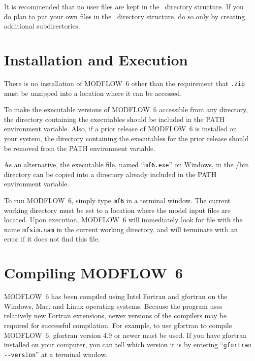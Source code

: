 \documentclass[11pt,twoside,twocolumn]{usgsreport}
\begin{document}


It is recommended that no user files are kept in the \modflowversion~directory structure.  If you do plan to put your own files in the \modflowversion~directory structure, do so only by creating additional subdirectories.

\section{Installation and Execution}
There is no installation of MODFLOW~6 other than the requirement that \texttt{\modflowversion.zip} must be unzipped into a location where it can be accessed.  

To make the executable versions of MODFLOW~6 accessible from any directory, the directory containing the executables should be included in the PATH environment variable.  Also, if a prior release of MODFLOW~6 is installed on your system, the directory containing the executables for the prior release should be removed from the PATH environment variable.

As an alternative, the executable file, named ``\texttt{mf6.exe}'' on Windows, in the \modflowversion{}/bin directory can be copied into a directory already included in the PATH environment variable.

To run MODFLOW~6, simply type \texttt{mf6} in a terminal window.  The current working directory must be set to a location where the model input files are located.  Upon execution, MODFLOW~6 will immediately look for file with the name \texttt{mfsim.nam} in the current working directory, and will terminate with an error if it does not find this file.

\section{Compiling MODFLOW~6}
MODFLOW~6 has been compiled using Intel Fortran and gfortran on the Windows, Mac, and Linux operating systems.  Because the program uses relatively new Fortran extensions, newer versions of the compilers may be required for successful compilation.  For example, to use gfortran to compile MODFLOW~6, gfortran version 4.9 or newer must be used.  If you have gfortran installed on your computer, you can tell which version it is by entering ``\verb|gfortran --version|'' at a terminal window.
\end{document}
